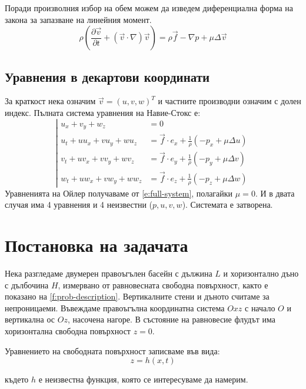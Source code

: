 \documentclass[12pt]{article}
\numberwithin{equation}{section}
\newcommand{\vel}{\vec{v}}
\begin{document}
Поради произволния избор на обем можем да изведем диференциална форма на закона за запазване на линейния момент.
\begin{equation}
    \label{e:momentum-diff-form}
    \rho\left(\frac{\partial\vel}{\partial t} + (\vel\cdot\nabla)\vel\right)=\rho\vec{f}-\nabla p+ \mu\Delta\vel
\end{equation}
\subsection{Уравнения в декартови координати}
За краткост нека означим $\vec{v}=(u,v,w)^T$ и частните производни означим с долен индекс. Пълната система уравнения на Навие-Стокс е:
\begin{equation}
    \label{e:full-system}
    \left|
    \begin{aligned}
        u_x + v_y + w_z&=0 \\
        u_t + uu_x + vu_y + wu_z &= \vec{f}\cdot e_x+\frac{1}{\rho}(-p_x + \mu \Delta u) \\
        v_t + uv_x + vv_y + wv_z &= \vec{f}\cdot e_y+\frac{1}{\rho}(-p_y + \mu \Delta v) \\
        w_t + uw_x + vw_y + ww_z &= \vec{f}\cdot e_z+\frac{1}{\rho}(-p_z + \mu \Delta w)
    \end{aligned}
    \right.
\end{equation}
Уравненията на Ойлер получаваме от \autoref{e:full-system}, полагайки $\mu=0$. И в двата случая има 4 уравнения и 4 неизвестни ($p, u, v, w$). Системата е затворена.

\section{Постановка на задачата}
Нека разгледаме двумерен правоъгълен басейн с дължина $L$ и хоризонтално дъно с дълбочина $H$, измервано от равновесната свободна повърхност, както е показано на \autoref{f:prob-description}. Вертикалните стени и дъното считаме за непроницаеми. Въвеждаме правоъгълна координатна система $Oxz$ с начало $O$ и вертикална ос $Oz$, насочена нагоре. В състояние на равновесие флудът има хоризонтална свободна повърхност $z = 0$.

Уравнението на свободната повърхност записваме във вида:
\begin{equation}
    \label{e:free-surface}
    z = h(x,t)
\end{equation}

където $h$ е неизвестна функция, която се интересуваме да намерим.
\end{document}
